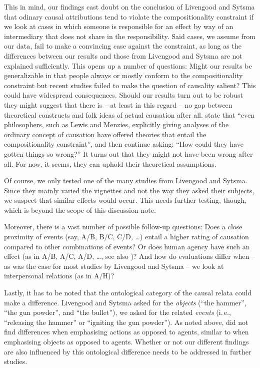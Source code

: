 \documentclass[12pt]{scrartcl}
\begin{document}
This in mind, our findings cast doubt on the conclusion of Livengood and Sytsma that odinary causal attributions tend to violate the compositionality constraint if we look at cases in which someone is responsible for an effect by way of an intermediary that does not share in the responsibility. Said cases, we assume from our data, fail to make a convincing case against the constraint, as long as the differences between our results and those from Livengood and Sytsma are not explained sufficiently. This opens up a number of questions: Might our results be generalizable in that people always or mostly conform to the compositionality constraint but recent studies failed to make the question of causality salient? This could have widespread consequences. Should our results turn out to be robust they might suggest that there is -- at least in this regard -- no gap between theoretical constructs and folk ideas of actual causation after all. \citet[64f.]{livengood_actual_2020} state that \enquote{even philosophers, such as Lewis and Menzies, explicitly giving analyses of the ordinary concept of causation have offered theories that entail the compositionality constraint}, and then continue asking: \enquote{How could they have gotten things so wrong?} It turns out that they might not have been wrong after all. For now, it seems, they can uphold their theoretical assumptions.

Of course, we only tested one of the many studies from Livengood and Sytsma. Since they mainly varied the vignettes and not the way they asked their subjects, we suspect that similar effects would occur. This needs further testing, though, which is beyond the scope of this discussion note.

Moreover, there is a vast number of possible follow-up questions: Does a close proximity of events (say, A/B, B/C, C/D, \dots) entail a higher rating of causation compared to other combinations of events? Or does human agency have such an effect (as in A/B, A/C, A/D, \dots, see also \cite{rose_folk_2017})? And how do evaluations differ when -- as was the case for most studies by Livengood and Sytsma -- we look at interpersonal relations (as in A/H)?

Lastly, it has to be noted that the ontological category of the causal relata could make a difference. Livengood and Sytsma asked for the \textit{objects} (\enquote{the hammer}, \enquote{the gun powder}, and \enquote{the bullet}), we asked for the related \textit{events} (i.\,e., \enquote{releasing the hammer} or \enquote{igniting the gun powder}). As noted above, \citet*{livengood_following_2017} did not find differences when emphasising actions as opposed to agents, similar to \citet*{livengood_actual_2020} when emphasising objects as opposed to agents. Whether or not our different findings are also influenced by this ontological difference needs to be addressed in further studies.
\end{document}
